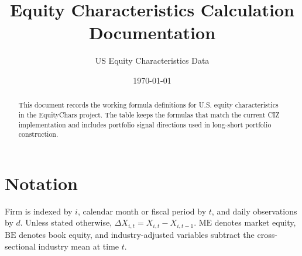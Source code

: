 \documentclass[11pt]{article}
\title{\Large\bfseries Equity Characteristics Calculation Documentation}
\author{US Equity Characteristics Data}
\date{\today}
\begin{document}
\maketitle

\begin{abstract}
This document records the working formula definitions for U.S. equity
characteristics in the EquityChars project. The table keeps the formulas that
match the current CIZ implementation and includes portfolio signal directions used in long-short portfolio construction.
\end{abstract}

\section{Notation}

Firm is indexed by \(i\), calendar month or fiscal period by \(t\), and daily
observations by \(d\). Unless stated otherwise, \(\Delta X_{i,t}=X_{i,t}-
X_{i,t-1}\). \(\mathrm{ME}\) denotes market equity, \(\mathrm{BE}\) denotes book
equity, and industry-adjusted variables subtract the cross-sectional industry
mean at time \(t\).
\end{document}
